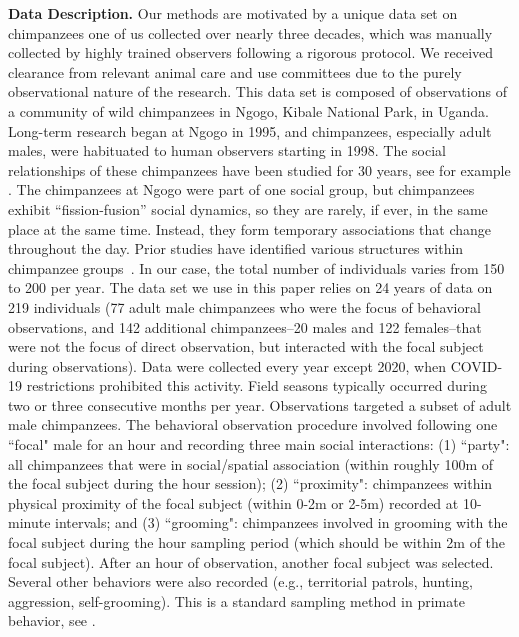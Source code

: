 \documentclass{article}
\theoremstyle{plain}
\theoremstyle{definition}
\theoremstyle{remark}
\begin{document}
\textbf{Data Description.} Our methods are motivated by a unique data set on chimpanzees one of us collected over nearly three decades, which was manually collected by highly trained observers following a rigorous protocol. We received clearance from relevant animal care and use committees due to the purely observational nature of the research. This data set is composed of observations of a community of wild chimpanzees in Ngogo, Kibale National Park, in Uganda. Long-term research began at Ngogo in 1995, and chimpanzees, especially adult males, were habituated to human observers starting in 1998. The social relationships of these chimpanzees have been studied for 30 years, see for example \citet{langergraber2017group}. The chimpanzees at Ngogo were part of one social group, but chimpanzees exhibit ``fission-fusion'' social dynamics, so they are rarely, if ever, in the same place at the same time. Instead, they form temporary associations that change throughout the day. Prior studies have identified various structures within chimpanzee groups~\cite{badihi2022flexibility, mitani2003social}. In our case, the total number of individuals varies from 150 to 200 per year. The data set we use in this paper relies on 24 years of data on 219 individuals (77 adult male chimpanzees who were the focus of behavioral observations, and 142 additional chimpanzees--20 males and 122 females--that were not the focus of direct observation, but interacted with the focal subject during observations). Data were collected every year except 2020, when COVID-19 restrictions prohibited this activity.
Field seasons typically occurred during two or three consecutive months per year. Observations targeted a subset of adult male chimpanzees. The behavioral observation procedure involved following one ``focal" male for an hour and recording three main social interactions: (1) ``party": all chimpanzees that were in social/spatial association (within roughly 100m of the focal subject during the hour session); (2) ``proximity": chimpanzees within physical proximity of the focal subject (within 0-2m or 2-5m) recorded at 10-minute intervals; and (3) ``grooming": chimpanzees involved in grooming with the focal subject during the hour sampling period (which should be within 2m of the focal subject). After an hour of observation, another focal subject was selected. Several other behaviors were also recorded (e.g., territorial patrols, hunting, aggression, self-grooming). This is a standard sampling method in primate behavior, see \citet{altmann1974observational}. 
\end{document}
